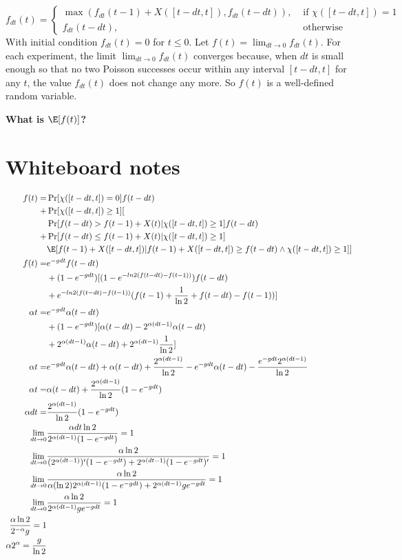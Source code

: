 \[
  f_{dt}(t) = \begin{cases}
    \max(f_{dt}(t - 1) + X([t - dt, t]), f_{dt}(t - dt)), & \text{ if } \chi([t - dt, t]) = 1\\
    f_{dt}(t - dt), & \text{ otherwise }
  \end{cases}
\]
With initial condition $f_{dt}(t) = 0$ for $t \leq 0$.
Let $f(t) = \lim_{dt \to 0} f_{dt}(t)$. For each experiment, the limit $\lim_{dt \to 0} f_{dt}(t)$ converges because, when $dt$ is small enough so that no two Poisson successes occur within any interval $[t - dt, t]$ for any $t$, the value $f_{dt}(t)$ does not change any more. So $f(t)$ is a well-defined random variable.

\textbf{What is $\E[f(t)]$?}

\section{Whiteboard notes}
\begin{align*}
  f(t) =& \Pr[\chi([t - dt, t]) = 0] f(t - dt)\\
      + &\Pr[\chi([t - dt, t]) \geq 1] [\\
        &\Pr[f(t - dt) > f(t - 1) + X(t) | \chi([t - dt, t]) \geq 1] f(t - dt)\\
      + &\Pr[f(t - dt) \leq f(t - 1) + X(t) | \chi([t - dt, t]) \geq 1]\\
        &\E[f(t - 1) + X([t - dt, t]) | f(t - 1) + X([t - dt, t]) \geq f(t - dt) \land \chi([t - dt, t]) \geq 1]]\\
  f(t) =& e^{-g dt} f(t - dt)\\&+ (1 - e^{-g dt}) [(1 - e^{-ln2 (f(t - dt) - f(t - 1))}) f(t - dt)\\ &+ e^{-ln2 (f(t - dt) - f(t - 1))} (f(t - 1) + \frac{1}{\ln2} + f(t - dt) - f(t - 1))]\\
  \alpha t =& e^{-g dt} \alpha(t - dt)\\ &+ (1 - e^{-g dt}) [\alpha(t - dt) - 2^{\alpha (dt - 1)} \alpha (t - dt)\\ &+ 2^{\alpha(dt - 1)} \alpha (t - dt) + 2^{\alpha(dt - 1)} \frac{1}{\ln2}]\\
  \alpha t =& e^{-g dt} \alpha (t - dt) + \alpha (t - dt) + \frac{2^{\alpha (dt - 1)}}{\ln2} - e^{-g dt} \alpha (t - dt) - \frac{e^{-g dt} 2^{\alpha (dt - 1)}}{\ln2}\\
  \alpha t =& \alpha(t - dt) + \frac{2^{\alpha (dt - 1)}}{\ln2} (1 - e^{-g dt})\\
  \alpha dt = & \frac{2^{\alpha (dt - 1)}}{\ln2} (1 - e^{-g dt})\\
  \lim_{dt \to 0}& \frac{\alpha dt \ln2}{2^{\alpha (dt - 1)} (1 - e^{-g dt})} = 1\\
  \lim_{dt \to 0}& \frac{\alpha \ln2}{(2^{\alpha(dt - 1)})'(1 - e^{-g dt}) + 2^{\alpha(dt - 1)} (1 - e^{-g dt})'} = 1\\
  \lim_{dt \to 0}& \frac{\alpha \ln2}{\alpha (\ln2) 2^{\alpha(dt - 1)} (1 - e^{-g dt}) + 2^{\alpha(dt - 1)} g e^{-g dt}} = 1\\
  \lim_{dt \to 0}& \frac{\alpha \ln2}{2^{\alpha(dt - 1)} g e^{-g dt}} = 1\\
  \frac{\alpha \ln2}{2^{-\alpha} g} = 1\\
  \alpha 2^\alpha = \frac{g}{\ln2}
\end{align*}